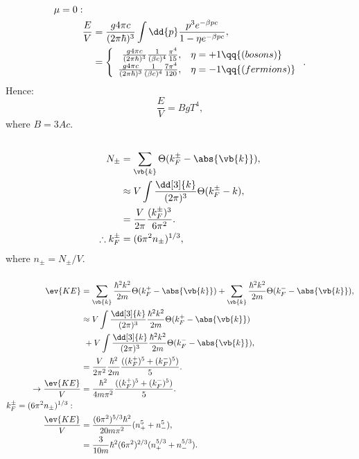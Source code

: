 \documentclass[a4paper,12pt,twoside]{article}
\begin{document}
\begin{multicols*}{2}
\begin{align}
	\mu = 0:\quad&\\
	\frac{E}{V} &= \frac{g4\pi c}{(2\pi\hbar)^3} \int \dd{p}\frac{p^3 e^{-\beta pc}}{1-\eta e^{-\beta pc}},\\
	&= \left\{
		\begin{array}{rl}
			\frac{g4\pi c}{(2\pi\hbar)^3} \frac{1}{(\beta c)^4} \frac{\pi^4}{15}, & \eta = +1\qq{(bosons)}\\
			\frac{g4\pi c}{(2\pi\hbar)^3} \frac{1}{(\beta c)^4} \frac{7\pi^4}{120}, & \eta = -1 \qq{(fermions)}
		\end{array}
	\right..
\end{align}
Hence:
\begin{equation}
	\frac{E}{V} = B g T^4,
\end{equation}
where $B = 3Ac$.

\subsection{}
\subsubsection{}
\begin{align}
	N_{\pm} &= \sum_{\vb{k}} \Theta(k_F^{\pm} - \abs{\vb{k}}),\\
	&\approx V\int \frac{\dd[3]{k}}{(2\pi)^3} \Theta(k_F^{\pm} - k),\\
	&= \frac{V}{2\pi} \frac{(k_F^\pm)^3}{6\pi^2}.\\
	\therefore k_F^\pm &= (6\pi^2 n_\pm)^{1/3},
\end{align}
where $n_\pm = N_\pm/V$.
\subsubsection{}
\begin{align}
	\ev{KE} &= \sum_{\vb{k}} \frac{\hbar^2 k^2}{2m} \Theta(k_F^+ - \abs{\vb{k}})
	+ \sum_{\vb{k}} \frac{\hbar^2 k^2}{2m} \Theta(k_F^- - \abs{\vb{k}}),\\
	&\approx V\int \frac{\dd[3]{k}}{(2\pi)^3} \frac{\hbar^2 k^2}{2m} \Theta(k_F^+ - \abs{\vb{k}})\nonumber\\
	&\ + V\int \frac{\dd[3]{k}}{(2\pi)^3} \frac{\hbar^2 k^2}{2m} \Theta(k_F^- - \abs{\vb{k}}),\\
	&= \frac{V}{2\pi^2} \frac{\hbar^2}{2m} \frac{((k_F^+)^5+(k_F^-)^5)}{5}.\\
	\rightarrow \frac{\ev{KE}}{V} &= \frac{\hbar^2}{4m\pi^2} \frac{((k_F^+)^5+(k_F^-)^5)}{5}.\\
	k_F^{\pm} = (6\pi^2n_{\pm})^{1/3}:\quad&\\
	\frac{\ev{KE}}{V} &= \frac{(6\pi^2)^{5/3}\hbar^2}{20m\pi^2} (n_+^5+n_-^5),\\
	&= \frac{3}{10m} \hbar^2 (6\pi^2)^{2/3} (n_+^{5/3}+n_-^{5/3}).
\end{align}

\end{multicols*}
\end{document}
